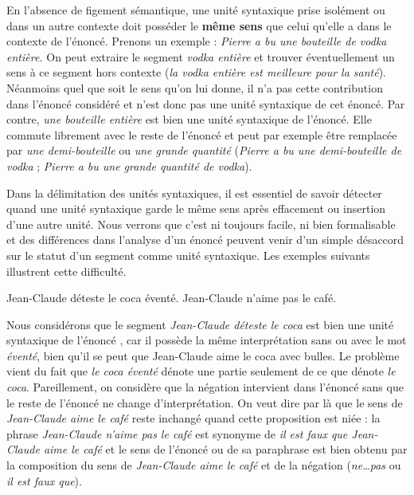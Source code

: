 En l’absence de figement sémantique, une unité syntaxique prise isolément ou dans un autre contexte doit posséder le \textbf{même sens} que celui qu’elle a dans le contexte de l’énoncé. Prenons un exemple : \textit{Pierre a bu une bouteille de vodka entière.} On peut extraire le segment \textit{vodka entière} et trouver éventuellement un sens à ce segment hors contexte (\textit{la vodka entière est meilleure pour la santé}). Néanmoins quel que soit le sens qu’on lui donne, il n’a pas cette contribution dans l’énoncé considéré et n’est donc pas une unité syntaxique de cet énoncé. Par contre, \textit{une bouteille entière} est bien une unité syntaxique de l’énoncé. Elle commute librement avec le reste de l’énoncé et peut par exemple être remplacée par \textit{une demi-bouteille} ou \textit{une grande quantité} (\textit{Pierre a bu une demi-bouteille de vodka} ; \textit{Pierre a bu une grande quantité de vodka}).

Dans la délimitation des unités syntaxiques, il est essentiel de savoir détecter quand une unité syntaxique garde le même sens après effacement ou insertion d’une autre unité. Nous verrons que c’est ni toujours facile, ni bien formalisable et des différences dans l’analyse d’un énoncé peuvent venir d’un simple désaccord sur le statut d’un segment comme unité syntaxique. Les exemples suivants illustrent cette difficulté.

\ea%
    \label{ex:key:1}
          {Jean-Claude}  {déteste}  {le}  {coca}  {éventé.}
\ex%
    \label{ex:key:2}
          {Jean-Claude}  {n’aime}  {pas}  {le}  {café.}
\z

Nous considérons que le segment \textit{Jean-Claude déteste le coca} est bien une unité syntaxique de l’énoncé , car il possède la même interprétation sans ou avec le mot \textit{éventé}, bien qu’il se peut que Jean-Claude aime le coca avec bulles. Le problème vient du fait que \textit{le coca éventé} dénote une partie seulement de ce que dénote \textit{le coca}. Pareillement, on considère que la négation intervient dans l’énoncé  sans que le reste de l’énoncé ne change d’interprétation. On veut dire par là que le sens de \textit{Jean-Claude aime le café} reste inchangé quand cette proposition est niée : la phrase \textit{Jean-Claude n’aime pas le café} est synonyme de \textit{il est faux que Jean-Claude aime le café} et le sens de l’énoncé  ou de sa paraphrase est bien obtenu par la composition du sens de \textit{Jean-Claude aime le café} et de la négation (\textit{ne…pas} ou \textit{il est faux que}).

